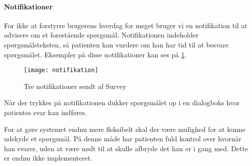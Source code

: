 \paragraph{Notifikationer}
For ikke at forstyrre brugerens hverdag for meget bruger vi en notifikation til at advisere om et forestående spørgsmål.
Notifikationen indeholder spørgsmålsteksten, så patienten kan vurdere om han har tid til at besvare spørgsmålet.
Eksempler på disse notifikationer kan ses på \cref{noti}.

\begin{figure}
	\centering
	\texttt{[image: notifikation]}
	\caption{Tre notifikationer sendt af Survey}\label{noti}
\end{figure}

Når der trykkes på notifikationen dukker spørgsmålet op i en dialogboks hvor patientes svar kan indføres.

For at gøre systemet endnu mere fleksibelt skal der være mulighed for at kunne udskyde et spørgsmål.
På denne måde har patienten fuld kontrol over hvornår han svarer, uden at være nødt til at skulle afbryde det han er i gang med.
Dette er endnu ikke implementeret.